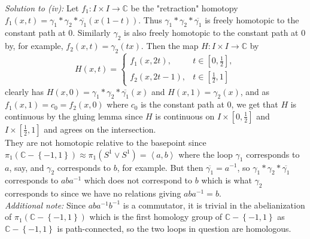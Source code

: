 \documentclass[reqno]{amsart}
\theoremstyle{definition}
\theoremstyle{remark}
\begin{document}
\textit{Solution to (iv):} Let $f_1 \colon I \times I \to \mathbb{C}$ 
be the "retraction" homotopy $f_1 (x,t) =
\gamma_1 * \gamma_2 * \overline{\gamma_1} \left( x(1-t) \right) $.
Thus $\gamma_1 * \gamma_2 * \overline{\gamma_1}$ is freely homotopic
to the constant path at $0$. Similarly
$\gamma_2$ is also freely homotopic to the constant path at $0$ by, for
example, $f_2 (x,t) = \gamma_2 \left( tx \right) $. Then
the map
$H \colon I \times I \to \mathbb{C}$ by
\[
H (x,t) = \begin{cases}
    f_1(x,2t),& t \in \left[ 0, \frac{1}{2} \right],\\
    f_2 (x, 2t-1),& t\in \left[ \frac{1}{2},1 \right] 
\end{cases}
\] 
clearly has $H(x,0) = \gamma_1 * \gamma_2 * \overline{\gamma_1}(x)$ 
and $H(x,1) = \gamma_2(x)$, and
as $f_1(x,1) = c_{0} = f_2(x, 0)$ where
$c_0$ is the constant path at $0$, we get that $H$ is continuous
by the gluing lemma since $H$ is continuous on
$I \times \left[ 0,\frac{1}{2} \right] $ and
$I \times \left[ \frac{1}{2},1 \right] $ and
agrees on the intersection.\\
\linebreak
They are not homotopic relative to the basepoint since
$\pi_1 \left( \mathbb{C} - \left\{ -1,1 \right\}  \right) 
\approx \pi_1 \left( S^{1} \vee S^{1} \right) 
= \left< a,b \right>$ where the loop
$\gamma_1$ corresponds to $a$, say, and $\gamma_2$ corresponds to
$b$, for example. But then
$\overline{\gamma_1} = a^{-1}$, so
$\gamma_1 * \gamma_2 * \overline{\gamma_1}$ corresponds to
$a b a^{-1}$ which does not correspond to 
$b$ which is what $\gamma_2$ corresponds to since
we have no relations giving $aba^{-1} = b$.\\
\linebreak
\textit{Additional note:} Since $aba^{-1}b^{-1}$ is a commutator,
it is trivial in the abelianization of $\pi_1 \left( \mathbb{C}
- \left\{ -1,1 \right\} \right) $ which is the
first homology group of $\mathbb{C} - \left\{ -1,1 \right\} $ as
$\mathbb{C} - \left\{ -1,1 \right\} $ is path-connected, so
the two loops in question are homologous.
\end{document}
